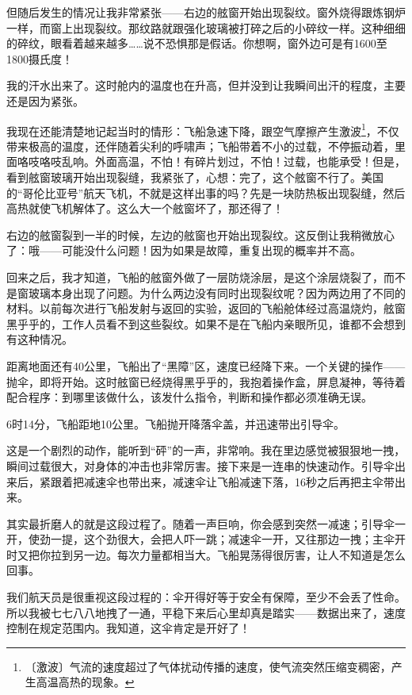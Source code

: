 \documentclass[12pt,UTF-8,openany]{ctexbook}
\begin{document}
\begin{normalsize}
    但随后发生的情况让我非常紧张——右边的舷窗开始出现裂纹。窗外烧得跟炼钢炉一样，而窗上出现裂纹。那纹路就跟强化玻璃被打碎之后的小碎纹一样。这种细细的碎纹，眼看着越来越多……说不恐惧那是假话。你想啊，窗外边可是有1600至1800摄氏度！
    
    我的汗水出来了。这时舱内的温度也在升高，但并没到让我瞬间出汗的程度，主要还是因为紧张。
    
    我现在还能清楚地记起当时的情形：飞船急速下降，跟空气摩擦产生激波\footnote{〔激波〕气流的速度超过了气体扰动传播的速度，使气流突然压缩变稠密，产生高温高热的现象。}，不仅带来极高的温度，还伴随着尖利的呼啸声；飞船带着不小的过载，不停振动着，里面咯吱咯吱乱响。外面高温，不怕！有碎片划过，不怕！过载，也能承受！但是，看到舷窗玻璃开始出现裂缝，我紧张了，心想：完了，这个舷窗不行了。美国的“哥伦比亚号”航天飞机，不就是这样出事的吗？先是一块防热板出现裂缝，然后高热就使飞机解体了。这么大一个舷窗坏了，那还得了！
    
    右边的舷窗裂到一半的时候，左边的舷窗也开始出现裂纹。这反倒让我稍微放心了：哦——可能没什么问题！因为如果是故障，重复出现的概率并不高。
    
    回来之后，我才知道，飞船的舷窗外做了一层防烧涂层，是这个涂层烧裂了，而不是窗玻璃本身出现了问题。为什么两边没有同时出现裂纹呢？因为两边用了不同的材料。以前每次进行飞船发射与返回的实验，返回的飞船舱体经过高温烧灼，舷窗黑乎乎的，工作人员看不到这些裂纹。如果不是在飞船内亲眼所见，谁都不会想到有这种情况。
    
    距离地面还有40公里，飞船出了“黑障”区，速度已经降下来。一个关键的操作——抛伞，即将开始。这时舷窗已经烧得黑乎乎的，我抱着操作盒，屏息凝神，等待着配合程序：到哪里该做什么，该发什么指令，判断和操作都必须准确无误。
    
    6时14分，飞船距地10公里。飞船抛开降落伞盖，并迅速带出引导伞。
    
    这是一个剧烈的动作，能听到“砰”的一声，非常响。我在里边感觉被狠狠地一拽，瞬间过载很大，对身体的冲击也非常厉害。接下来是一连串的快速动作。引导伞出来后，紧跟着把减速伞也带出来，减速伞让飞船减速下落，16秒之后再把主伞带出来。
    
    其实最折磨人的就是这段过程了。随着一声巨响，你会感到突然一减速；引导伞一开，使劲一提，这个劲很大，会把人吓一跳；减速伞一开，又往那边一拽；主伞开时又把你拉到另一边。每次力量都相当大。飞船晃荡得很厉害，让人不知道是怎么回事。
    
    我们航天员是很重视这段过程的：伞开得好等于安全有保障，至少不会丢了性命。所以我被七七八八地拽了一通，平稳下来后心里却真是踏实——数据出来了，速度控制在规定范围内。我知道，这伞肯定是开好了！
    

\end{normalsize}
\end{document}
